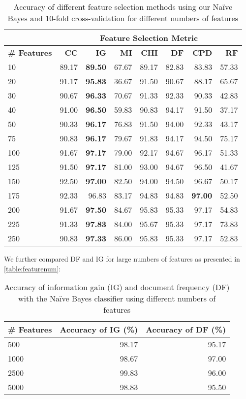 \documentclass[10pt, a4paper]{article}
\begin{document}
\begin{table}[H]
\centering
\caption{Accuracy of different feature selection methods using our Na\"ive Bayes and 10-fold cross-validation for different numbers of features}
\begin{tabular}{@{}l rrrrrrr@{}}
\toprule
& \multicolumn{7}{c}{\textbf{Feature Selection Metric}}\\
\midrule
\textbf{\# Features} & \textbf{CC} & \textbf{IG} & \textbf{MI} & \textbf{CHI} & \textbf{DF} & \textbf{CPD} & \textbf{RF} \\
\midrule
10 & 89.17 & \textbf{89.50} & 67.67 & 89.17 & 82.83 & 83.83 & 57.33 \\
20 & 91.17 & \textbf{95.83} & 36.67 & 91.50 & 90.67 & 88.17 & 65.67 \\
30 & 90.67 & \textbf{96.33} & 70.67 & 91.33 & 92.33 & 90.33 & 42.83 \\
40 & 91.00 & \textbf{96.50} & 59.83 & 90.83 & 94.17 & 91.50 & 37.17 \\
50 & 90.33 & \textbf{96.17} & 76.83 & 91.50 & 94.00 & 92.33 & 43.17 \\
75 & 90.83 & \textbf{96.17} & 79.67 & 91.83 & 94.17 & 94.50 & 75.17 \\
100 & 91.67 & \textbf{97.17} & 79.00 & 92.17 & 94.67 & 96.17 & 51.33 \\
125 & 91.50 & \textbf{97.17} & 81.00 & 93.00 & 94.67 & 96.50 & 41.67 \\
150 & 92.50 & \textbf{97.00} & 82.50 & 94.00 & 94.50 & 96.67 & 50.17 \\
175 & 92.33 & 96.83 & 83.17 & 94.83 & 94.83 & \textbf{97.00} & 52.50 \\
200 & 91.67 & \textbf{97.50} & 84.67 & 95.83 & 95.33 & 97.17 & 54.83 \\
225 & 91.33 & \textbf{97.83} & 84.00 & 95.67 & 95.33 & 97.17 & 73.83 \\
250 & 90.83 & \textbf{97.33} & 86.00 & 95.83 & 95.33 & 97.17 & 52.83 \\
\bottomrule
\end{tabular}
\label{table:Ediffbody}
\end{table}

We further compared DF and IG for large numbers of features as presented in \autoref{table:featurenum}:
\begin{table}[H]
\centering
\caption{Accuracy of information gain (IG) and document frequency (DF) with the Na\"ive Bayes classifier using different numbers of features}
\begin{tabular}{@{}lrr@{}}
\toprule
\textbf{\# Features} & \textbf{Accuracy of IG (\%)} & \textbf{Accuracy of DF (\%)} \\
\midrule
500 & 98.17 & 95.17 \\
1000 & 98.67 & 97.00 \\
2500 & 99.83 & 96.00 \\
5000 & 98.83 & 95.50 \\
\bottomrule
\end{tabular}
\label{table:featurenum}
\end{table}
\end{document}
